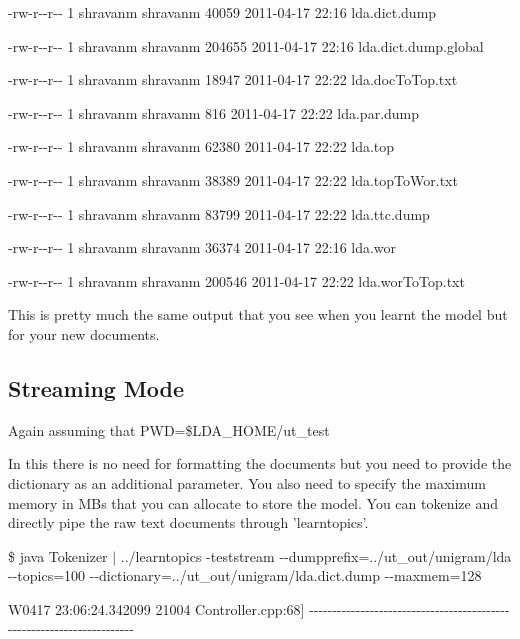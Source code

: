 {\ttfamily -\/rw-\/r-\/-\/r-\/-\/ 1 shravanm shravanm 40059 2011-\/04-\/17 22:16 lda.dict.dump  }

{\ttfamily -\/rw-\/r-\/-\/r-\/-\/ 1 shravanm shravanm 204655 2011-\/04-\/17 22:16 lda.dict.dump.global  }

{\ttfamily -\/rw-\/r-\/-\/r-\/-\/ 1 shravanm shravanm 18947 2011-\/04-\/17 22:22 lda.docToTop.txt  }

{\ttfamily -\/rw-\/r-\/-\/r-\/-\/ 1 shravanm shravanm 816 2011-\/04-\/17 22:22 lda.par.dump  }

{\ttfamily -\/rw-\/r-\/-\/r-\/-\/ 1 shravanm shravanm 62380 2011-\/04-\/17 22:22 lda.top  }

{\ttfamily -\/rw-\/r-\/-\/r-\/-\/ 1 shravanm shravanm 38389 2011-\/04-\/17 22:22 lda.topToWor.txt  }

{\ttfamily -\/rw-\/r-\/-\/r-\/-\/ 1 shravanm shravanm 83799 2011-\/04-\/17 22:22 lda.ttc.dump  }

{\ttfamily -\/rw-\/r-\/-\/r-\/-\/ 1 shravanm shravanm 36374 2011-\/04-\/17 22:16 lda.wor  }

{\ttfamily -\/rw-\/r-\/-\/r-\/-\/ 1 shravanm shravanm 200546 2011-\/04-\/17 22:22 lda.worToTop.txt  }

{\ttfamily \par
  } 

This is pretty much the same output that you see when you learnt the model but for your new documents. 

\par
  \hypertarget{single__machine__usage_stream_mode}{}\subsection{Streaming Mode}\label{single__machine__usage_stream_mode}
Again assuming that PWD=\$LDA\_\-HOME/ut\_\-test 

In this there is no need for formatting the documents but you need to provide the dictionary as an additional parameter. You also need to specify the maximum memory in MBs that you can allocate to store the model. You can tokenize and directly pipe the raw text documents through 'learntopics'.  {\ttfamily  }

{\ttfamily \$ java Tokenizer $|$ ../learntopics -\/teststream -\/-\/dumpprefix=../ut\_\-out/unigram/lda -\/-\/topics=100 -\/-\/dictionary=../ut\_\-out/unigram/lda.dict.dump -\/-\/maxmem=128 }

{\ttfamily W0417 23:06:24.342099 21004 Controller.cpp:68\mbox{]} -\/-\/-\/-\/-\/-\/-\/-\/-\/-\/-\/-\/-\/-\/-\/-\/-\/-\/-\/-\/-\/-\/-\/-\/-\/-\/-\/-\/-\/-\/-\/-\/-\/-\/-\/-\/-\/-\/-\/-\/-\/-\/-\/-\/-\/-\/-\/-\/-\/-\/-\/-\/-\/-\/-\/-\/-\/-\/-\/-\/-\/-\/-\/-\/-\/-\/-\/-\/-\/-\/}

